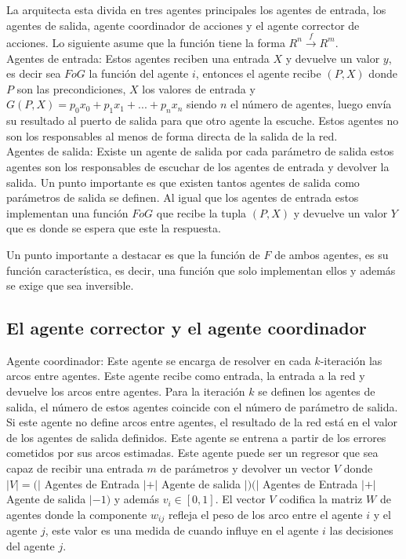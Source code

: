 \documentclass{article}
\begin{document}
        La arquitecta esta divida en tres agentes principales los agentes de entrada, los agentes de salida, agente coordinador de acciones y el agente corrector de acciones. Lo siguiente asume que la función tiene la forma $R^n \xrightarrow{f} R^m$. \\

        Agentes de entrada: Estos agentes reciben una entrada $X$ y devuelve un valor $y$, es decir sea $FoG$ la función del agente $i$, entonces el agente recibe $(P,X)$ donde $P$ son las precondiciones, $X$ los valores de entrada y 
        $G(P,X)=p_0x_0 + p_1x_1 +...+p_nx_n$ siendo $n$ el número de agentes, luego envía su resultado al puerto de salida para que otro agente la escuche. Estos agentes no son los responsables al menos de forma directa de la salida de la red.\\

        Agentes de salida: Existe un agente de salida por cada parámetro de salida estos agentes son los responsables de escuchar de los agentes de entrada y devolver la salida. 
        Un punto importante es que existen tantos agentes de salida como parámetros de salida se definen. Al igual que los agentes de entrada estos implementan una función $FoG$ que recibe la tupla $(P,X)$ y devuelve un valor $Y$ que es donde se espera que este la respuesta.
    
        Un punto importante a destacar es que la función de $F$ de ambos agentes, es su función característica, es decir, una función que solo implementan ellos y además se exige que sea inversible.

        \subsection*{El agente corrector y el agente coordinador}

        Agente coordinador: Este agente se encarga de resolver en cada $k$-iteración las arcos entre agentes. Este agente recibe como entrada, la entrada a la red y devuelve los arcos entre agentes. Para la iteración $k$ se definen los agentes de salida, el número de estos agentes coincide con el número de parámetro de salida. Si este agente no define arcos entre agentes, el resultado de la red está en el valor de los agentes de salida definidos. Este agente se entrena a partir de los errores cometidos por sus arcos estimadas. Este agente puede ser un regresor que sea capaz de recibir una entrada $m$ de parámetros y devolver un vector $V$ donde $|V|=(|$ Agentes de Entrada $| + |$ Agente de salida $|)(|$ Agentes de Entrada $| + |$ Agente de salida $| - 1)$ y además $v_i \in [0,1]$. El vector $V$ codifica la matriz $W$ de agentes donde la componente $w_{ij}$ refleja el peso de los arco entre el agente $i$ y el agente $j$, este valor es una medida de cuando influye en el agente $i$ las decisiones del agente $j$.\\
\end{document}
